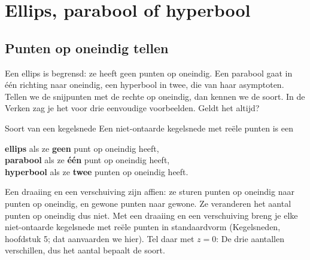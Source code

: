 \begin{oefeningen}
\end{oefeningen}

\section{Ellips, parabool of hyperbool}\label{sec:h3-type}

\subsection{Punten op oneindig tellen}

Een ellips is begrensd: ze heeft geen punten op oneindig. Een parabool gaat in één richting naar oneindig, een hyperbool in twee, die van haar asymptoten. Tellen we de snijpunten met de rechte op oneindig, dan kennen we de soort. In de Verken zag je het voor drie eenvoudige voorbeelden. Geldt het altijd?

\begin{theorie}
\begin{stelling}{Soort van een kegelsnede}
Een niet-ontaarde kegelsnede met reële punten is een

\vspace{1mm}
\qquad \textbf{\textcolor{accent}{ellips}} als ze \textbf{\textcolor{accent}{geen}} punt op oneindig heeft,\\
\qquad \textbf{\textcolor{accent}{parabool}} als ze \textbf{\textcolor{accent}{één}} punt op oneindig heeft,\\
\qquad \textbf{\textcolor{accent}{hyperbool}} als ze \textbf{\textcolor{accent}{twee}} punten op oneindig heeft.
\end{stelling}

\begin{bewijs}
Een draaiing en een verschuiving zijn affien: ze sturen punten op oneindig naar punten op oneindig, en gewone punten naar gewone. Ze veranderen het aantal punten op oneindig dus niet. Met een draaiing en een verschuiving breng je elke niet-ontaarde kegelsnede met reële punten in standaardvorm (Kegelsneden, hoofdstuk 5; dat aanvaarden we hier). Tel daar met $z = 0$:
De drie aantallen verschillen, dus het aantal bepaalt de soort.
\end{bewijs}
\end{theorie}

